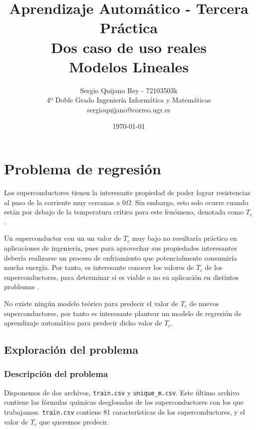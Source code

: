 \documentclass[11pt]{article}
\title{
    {Aprendizaje Automático - Tercera Práctica}\\
    {Dos caso de uso reales}\\  %
    {Modelos Lineales}
}
\author{
    {Sergio Quijano Rey - 72103503k}\\
    {4º Doble Grado Ingeniería Informática y Matemáticas}\\
    {sergioquijano@correo.ugr.es}
}
\date{\today}
\begin{document}
\maketitle
\pagebreak

\tableofcontents

\listoffigures




\pagebreak

\section{Problema de regresión}

Los superconductores tienen la interesante propiedad de poder lograr resistencias al paso de la corriente muy cercanas a $0\Omega$. Sin embargo, esto solo ocurre cuando están por debajo de la temperatura crítica para este fenómeno, denotada como $T_c$.

Un superconductor con un un valor de $T_c$ muy bajo no resultaría práctico en aplicaciones de ingeniería, pues para aprovechar sus propiedades interesantes debería realizarse un proceso de enfriamiento que potencialmente consumiría mucha energía. Por tanto, es interesante conocer los valores de $T_c$ de los superconductores, para determinar si es viable o no su aplicación en distintos problemas .

No existe ningún modelo teórico para predecir el valor de $T_c$ de nuevos superconductores, por tanto es interesante plantear un modelo de regresión de aprendizaje automático para predecir dicho valor de $T_c$.


\subsection{Exploración del problema}

\subsubsection{Descripción del problema}

Disponemos de dos archivos, \lstinline{train.csv} y \lstinline{unique_m.csv}. Este último archivo contiene las fórmulas químicas desglosadas de los superconductores con los que trabajamos. \lstinline{train.csv} contiene 81 características de los superconductores, y el valor de $T_c$ que queremos predecir.
\end{document}
